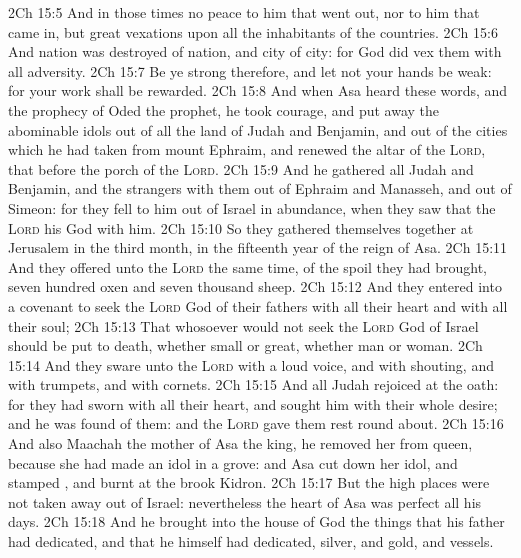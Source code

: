 \vs 2Ch 15:5 And in those times  no peace to him that went out, nor to him that came in, but great vexations  upon all the inhabitants of the countries.
\vs 2Ch 15:6 And nation was destroyed of nation, and city of city: for God did vex them with all adversity.
\vs 2Ch 15:7 Be ye strong therefore, and let not your hands be weak: for your work shall be rewarded.
\vs 2Ch 15:8 And when Asa heard these words, and the prophecy of Oded the prophet, he took courage, and put away the abominable idols out of all the land of Judah and Benjamin, and out of the cities which he had taken from mount Ephraim, and renewed the altar of the \textsc{Lord}, that  before the porch of the \textsc{Lord}.
\vs 2Ch 15:9 And he gathered all Judah and Benjamin, and the strangers with them out of Ephraim and Manasseh, and out of Simeon: for they fell to him out of Israel in abundance, when they saw that the \textsc{Lord} his God  with him.
\vs 2Ch 15:10 So they gathered themselves together at Jerusalem in the third month, in the fifteenth year of the reign of Asa.
\vs 2Ch 15:11 And they offered unto the \textsc{Lord} the same time, of the spoil  they had brought, seven hundred oxen and seven thousand sheep.
\vs 2Ch 15:12 And they entered into a covenant to seek the \textsc{Lord} God of their fathers with all their heart and with all their soul;
\vs 2Ch 15:13 That whosoever would not seek the \textsc{Lord} God of Israel should be put to death, whether small or great, whether man or woman.
\vs 2Ch 15:14 And they sware unto the \textsc{Lord} with a loud voice, and with shouting, and with trumpets, and with cornets.
\vs 2Ch 15:15 And all Judah rejoiced at the oath: for they had sworn with all their heart, and sought him with their whole desire; and he was found of them: and the \textsc{Lord} gave them rest round about.
\vs 2Ch 15:16 And also  Maachah the mother of Asa the king, he removed her from  queen, because she had made an idol in a grove: and Asa cut down her idol, and stamped , and burnt  at the brook Kidron.
\vs 2Ch 15:17 But the high places were not taken away out of Israel: nevertheless the heart of Asa was perfect all his days.
\vs 2Ch 15:18 And he brought into the house of God the things that his father had dedicated, and that he himself had dedicated, silver, and gold, and vessels.
